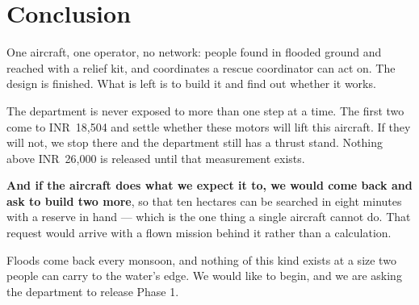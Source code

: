 \documentclass[11pt,a4paper]{article}
\newcommand{\rs}[1]{\mbox{INR~#1}}
\begin{document}
\section{Conclusion}

One aircraft, one operator, no network: people found in flooded ground and
reached with a relief kit, and coordinates a rescue coordinator can act on. The
design is finished. What is left is to build it and find out whether it works.

The department is never exposed to more than one step at a time. The first two
come to \rs{18{,}504} and settle whether these motors will lift this aircraft.
If they will not, we stop there and the department still has a thrust stand.
Nothing above \rs{26{,}000} is released until that measurement exists.

\textbf{And if the aircraft does what we expect it to, we would come back and
ask to build two more}, so that ten hectares can be searched in eight minutes
with a reserve in hand --- which is the one thing a single aircraft cannot do.
That request would arrive with a flown mission behind it rather than a
calculation.

Floods come back every monsoon, and nothing of this kind exists at a size two
people can carry to the water's edge. We would like to begin, and we are asking
the department to release Phase 1.


\end{document}
